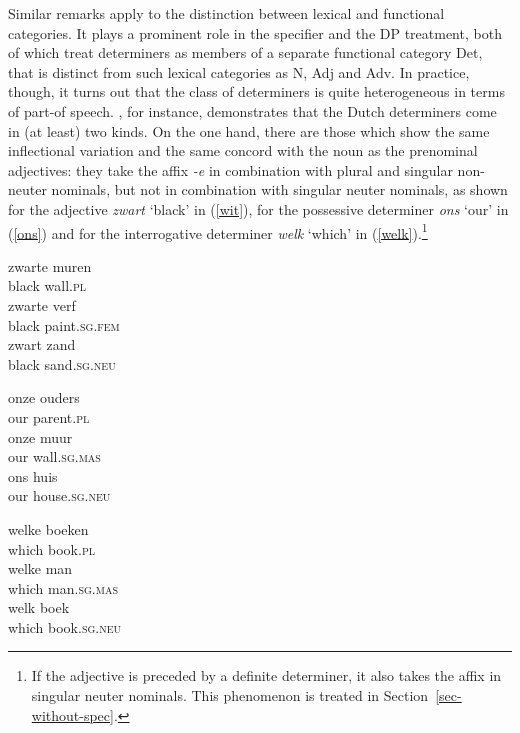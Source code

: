 \documentclass[output=paper
	        ,collection
	        ,collectionchapter
 	        ,biblatex
                ,babelshorthands
                ,newtxmath
                ,draftmode
                ,colorlinks, citecolor=brown
]{langscibook}
\begin{document}
Similar remarks apply to the distinction between lexical and functional categories. 
It plays a prominent role in the specifier and the DP treatment, both of which treat 
determiners as members of a separate functional category Det, that is distinct from 
such lexical categories as N, Adj and Adv.
In practice, though, it turns out that the class of determiners is quite heterogeneous in 
terms of part-of speech. \citet{VanEynde06}, for instance, demonstrates that the 
Dutch determiners come in (at least) two kinds. On the one hand, there are those 
which show the same inflectional variation and the same concord with the noun as the 
prenominal adjectives: they take the affix \emph{-e} in combination with plural 
and singular non-neuter nominals, but not in combination with singular 
neuter nominals, as shown for the adjective \emph{zwart} `black' in (\ref{wit}), 
for the possessive determiner \emph{ons} `our' in (\ref{ons}) and for the 
interrogative determiner \emph{welk} `which' in (\ref{welk}).\footnote{If the adjective 
is preceded by a definite determiner, 
it also takes the affix in singular neuter nominals. This phenomenon is treated 
in Section~\ref{sec-without-spec}.} 

\begin{exe} 
\ex\label{wit} 
\begin{xlist}
\ex
\gll  zwarte muren      \\
      black wall.\textsc{pl} \\
\ex
\gll  zwarte verf \\
      black paint.\textsc{sg.fem} \\
\ex
\gll  zwart zand \\
      black sand.\textsc{sg.neu} \\
\end{xlist}
\ex\label{ons}
\begin{xlist}
\ex
\gll onze ouders     \\
     our parent.\textsc{pl}  \\
\ex
\gll onze muur     \\
     our wall.\textsc{sg.mas}  \\
\ex
\gll ons huis     \\
     our house.\textsc{sg.neu}  \\
\end{xlist}
\ex\label{welk}
\begin{xlist} 
\ex
\gll welke boeken  \\
     which book.\textsc{pl} \\
\ex
\gll welke man                 \\
     which man.\textsc{sg.mas}  \\
\ex
\gll welk boek   \\
     which book.\textsc{sg.neu} \\
\end{xlist}
\end{exe} 
\end{document}
